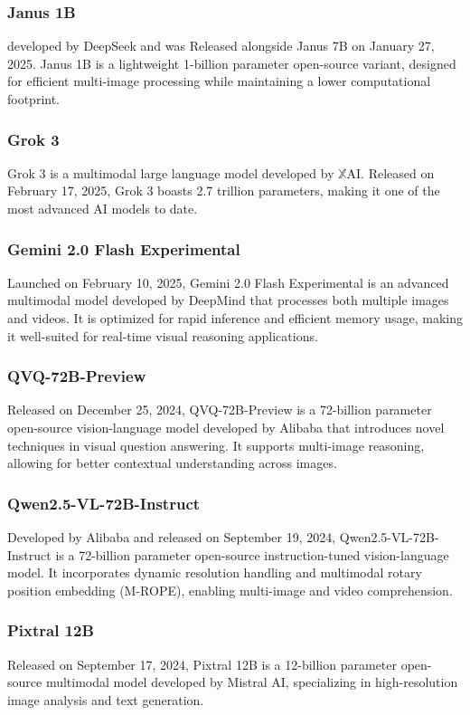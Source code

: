 \subsubsection{Janus 1B} 
developed by DeepSeek and was Released alongside Janus 7B on January 27, 2025. Janus 1B \cite{chen2025janus} is a lightweight 1-billion parameter open-source variant, designed for efficient multi-image processing while maintaining a lower computational footprint.

\subsubsection{Grok 3} Grok 3 is a multimodal large language model developed by $\mathbb{X}$AI. Released on February 17, 2025, Grok 3 boasts 2.7 trillion parameters, making it one of the most advanced AI models to date. 

\subsubsection{Gemini 2.0 Flash Experimental} 
Launched on February 10, 2025, Gemini 2.0 Flash Experimental \cite{gemini} is an advanced multimodal model developed by DeepMind that processes both multiple images and videos. It is optimized for rapid inference and efficient memory usage, making it well-suited for real-time visual reasoning applications.

\subsubsection{QVQ-72B-Preview} 
Released on December 25, 2024, QVQ-72B-Preview \cite{bai2023qwen} is a 72-billion parameter open-source vision-language model developed by Alibaba that introduces novel techniques in visual question answering. It supports multi-image reasoning, allowing for better contextual understanding across images.

\subsubsection{Qwen2.5-VL-72B-Instruct} 
Developed by Alibaba and released on September 19, 2024, Qwen2.5-VL-72B-Instruct \cite{bai2023qwen} is a 72-billion parameter open-source instruction-tuned vision-language model. It incorporates dynamic resolution handling and multimodal rotary position embedding (M-ROPE), enabling multi-image and video comprehension.

\subsubsection{Pixtral 12B} 
Released on September 17, 2024, Pixtral 12B \cite{agrawal2024pixtral} is a 12-billion parameter open-source multimodal model developed by Mistral AI, specializing in high-resolution image analysis and text generation.

